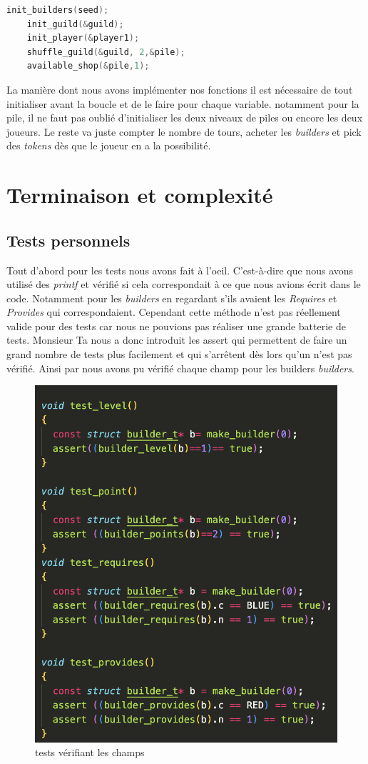 \documentclass{article}
\begin{document}
\begin{tcolorbox}[colback=gray!10,colframe=white!75!black]
\label{boucle}
\begin{lstlisting}[language=C, caption={La fonction \text{Boucle de jeu}},label={lst:exemple14-c}]
init_builders(seed);
    init_guild(&guild);
    init_player(&player1);
    shuffle_guild(&guild, 2,&pile);
    available_shop(&pile,1);
\end{lstlisting}
\end{tcolorbox}

La manière dont nous avons implémenter nos fonctions il est nécessaire de tout initialiser avant la boucle et de le faire pour chaque variable. notamment pour la pile, il ne faut pas oublié d'initialiser les deux niveaux de piles ou encore les deux joueurs. Le reste va juste compter le nombre de tours, acheter les \emph{builders} et pick des \emph{tokens} dès que le joueur en a la possibilité.




\section{Terminaison et complexité}

\subsection{Tests personnels}

\vspace{1em}   Tout d'abord pour les tests nous avons fait à l'oeil. C'est-à-dire que nous avons utilisé des \emph{printf} et vérifié si cela correspondait à ce que nous avions écrit dans le code. Notamment pour les \emph{builders} en regardant s'ils avaient les \emph{Requires} et \emph{Provides} qui correspondaient. Cependant cette méthode n'est pas réellement valide pour des tests car nous ne pouvions pas réaliser une grande batterie de tests. Monsieur Ta nous a donc introduit les assert qui permettent de faire un grand nombre de tests plus facilement et qui s'arrêtent dès lors qu'un n'est pas vérifié. Ainsi par nous avons pu vérifié chaque champ pour les builders \emph{builders}. 

\begin{figure}[ht]
    \centering
    \includegraphics[width=0.3\linewidth]{test builders.png}
    \caption{tests vérifiant les champs}
    \label{fig:testbuilder}
\end{figure}
\end{document}
